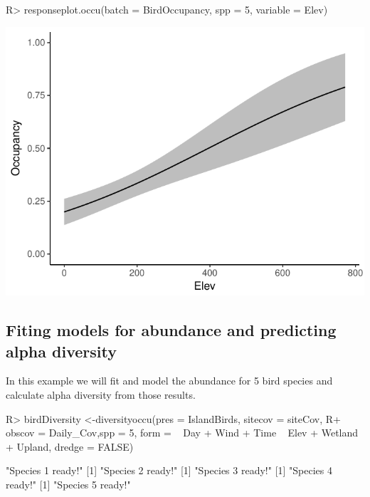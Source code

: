 \documentclass[article]{jss}
\begin{document}
\begin{CodeChunk}

\begin{CodeInput}
R> responseplot.occu(batch = BirdOccupancy, spp =  5, variable = Elev)
\end{CodeInput}


\begin{center}\includegraphics{diversityocc_files/figure-latex/unnamed-chunk-14-1} \end{center}

\end{CodeChunk}

\subsection{Fiting models for abundance and predicting alpha
diversity}\label{fiting-models-for-abundance-and-predicting-alpha-diversity}

In this example we will fit and model the abundance for 5 bird species
and calculate alpha diversity from those results.

\begin{CodeChunk}

\begin{CodeInput}
R> birdDiversity <-diversityoccu(pres = IslandBirds, sitecov = siteCov,
R+ obscov = Daily_Cov,spp =  5, form = ~ Day + Wind + Time ~ Elev + Wetland + Upland, dredge = FALSE)
\end{CodeInput}

\begin{CodeOutput}
[1] "Species 1 ready!"
[1] "Species 2 ready!"
[1] "Species 3 ready!"
[1] "Species 4 ready!"
[1] "Species 5 ready!"
\end{CodeOutput}
\end{CodeChunk}
\end{document}
